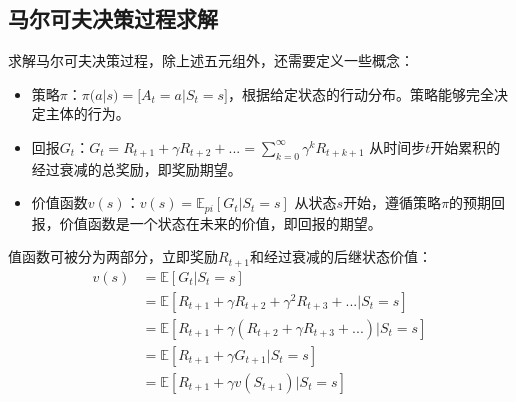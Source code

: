 %
%
%

\subsection{马尔可夫决策过程求解}
求解马尔可夫决策过程，除上述五元组外，还需要定义一些概念：
\begin{itemize}
\item 策略$\pi$：$\pi(a|s)=\mathbb[A_t=a|S_t=s]$，根据给定状态的行动分布。策略能够完全决定主体的行为。
\item 回报$G_t$：$G_t = R_{t+1} + \gamma R_{t+2} + ... = \sum_{k=0}^\infty \gamma^kR_{t+k+1}$ 从时间步$t$开始累积的经过衰减的总奖励，即奖励期望。
\item 价值函数$v(s)$：$v(s)=\mathbb{E}_{pi}[G_t|S_t=s]$ 从状态$s$开始，遵循策略$\pi$的预期回报，价值函数是一个状态在未来的价值，即回报的期望。
\end{itemize}
值函数可被分为两部分，立即奖励$R_{t+1}$和经过衰减的后继状态价值：
\begin{equation}\label{eq:Bellman}
\begin{aligned}
v(s) & = \mathbb{E}[G_t|S_t = s] \\
     & = \mathbb{E}[R_{t+1} + \gamma R_{t+2} + \gamma^2 R_{t+3}+...|S_t=s]\\
     & = \mathbb{E}[R_{t+1} + \gamma(R_{t+2} + \gamma R_{t+3}+...)|S_t=s]\\
     & = \mathbb{E}[R_{t+1} + \gamma G_{t+1}|S_t=s]\\
     & = \mathbb{E}[R_{t+1} + \gamma v(S_{t+1})|S_t=s]\\
\end{aligned}
\end{equation}

